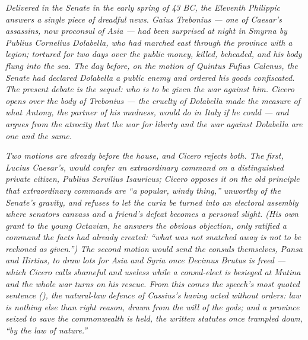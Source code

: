 
\textit{Delivered in the Senate in the early spring of 43 BC, the
Eleventh Philippic answers a single piece of dreadful news. Gaius
Trebonius --- one of Caesar's assassins, now proconsul of Asia ---
had been surprised at night in Smyrna by Publius Cornelius
Dolabella, who had marched east through the province with a legion;
tortured for two days over the public money, killed, beheaded, and
his body flung into the sea. The day before, on the motion of
Quintus Fufius Calenus, the Senate had declared Dolabella a public
enemy and ordered his goods confiscated. The present debate is the
sequel: who is to be given the war against him. Cicero opens over
the body of Trebonius --- the cruelty of Dolabella made the measure
of what Antony, the partner of his madness, would do in Italy if he
could --- and argues from the atrocity that the war for liberty and
the war against Dolabella are one and the same.}

\textit{Two motions are already before the house, and Cicero rejects
both. The first, Lucius Caesar's, would confer an extraordinary
command on a distinguished private citizen, Publius Servilius
Isauricus; Cicero opposes it on the old principle that extraordinary
commands are ``a popular, windy thing,'' unworthy of the Senate's
gravity, and refuses to let the curia be turned into an electoral
assembly where senators canvass and a friend's defeat becomes a
personal slight. (His own grant to the young Octavian, he answers
the obvious objection, only ratified a command the facts had already
created: ``what was not snatched away is not to be reckoned as
given.'') The second motion would send the consuls themselves,
Pansa and Hirtius, to draw lots for Asia and Syria once Decimus
Brutus is freed --- which Cicero calls shameful and useless while a
consul-elect is besieged at Mutina and the whole war turns on his
rescue. From this comes the speech's most quoted sentence
(), the natural-law defence of Cassius's having
acted without orders: law is nothing else than right reason, drawn
from the will of the gods; and a province seized to save the
commonwealth is held, the written statutes once trampled down, ``by
the law of nature.''}

